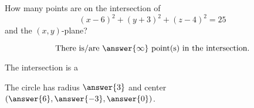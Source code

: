 \documentclass{ximera}
\author{Bart Snapp}
\begin{document}
\begin{exercise}
  How many points are on the intersection of
  \[
  (x-6)^2 + (y+3)^2 + (z-4)^2 = 25
  \]
  and the $(x,y)$-plane?
  \begin{prompt}
  \[
  \text{There is/are $\answer{\infty}$ point(s) in the intersection.}
  \]
  \end{prompt}
  \begin{exercise}
    The intersection is a
    \begin{multipleChoice}
    \end{multipleChoice}
    \begin{exercise}
    The circle has radius $\answer{3}$ and center
    $(\answer{6},\answer{-3},\answer{0})$.
    \end{exercise}
  \end{exercise}
\end{exercise}
\end{document}
